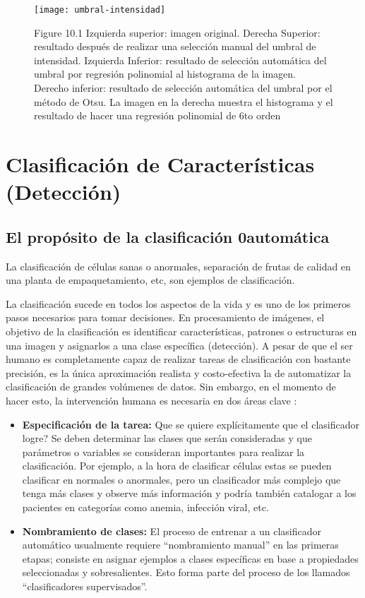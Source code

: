     \begin{figure}[H]
        \centering
        \texttt{[image: umbral-intensidad]}
        \caption{Figure 10.1 Izquierda superior: imagen original. Derecha Superior: resultado después de realizar una selección manual del umbral de intensidad. Izquierda Inferior: resultado de selección automática del umbral por regresión polinomial al histograma de la imagen. Derecho inferior: resultado de selección automática del umbral por el método de Otsu. La imagen en la derecha muestra el histograma y el resultado de hacer una regresión polinomial de 6to orden \protect\cite{Solomon2011-xz}}
        \label{fig:umbral-intensidad}
    \end{figure}
    


\section{Clasificación de Características (Detección)}
\subsection{El propósito de la clasificación 0automática}
La clasificación de células sanas o anormales, separación de frutas de calidad en una planta de empaquetamiento, etc, son ejemplos de clasificación. 

La clasificación sucede en todos los aspectos de la vida y es uno de los primeros pasos necesarios para tomar decisiones. En procesamiento de imágenes, el objetivo de la clasificación es identificar características, patrones o estructuras en una imagen y asignarlos a una clase específica (detección). A pesar de que el ser humano es completamente capaz de realizar tareas de clasificación con bastante precisión, es la única aproximación realista y costo-efectiva la de automatizar la clasificación de grandes volúmenes de datos. Sin embargo, en el momento de hacer esto, la intervención humana es necesaria en dos áreas clave \cite{Solomon2011-xz}: 

\begin{itemize}
\item \textbf{Especificación de la tarea: }Que se quiere explícitamente que el clasificador logre? Se deben determinar las clases que serán consideradas y que parámetros o variables se consideran importantes para realizar la clasificación. Por ejemplo, a la hora de clasificar células estas se pueden clasificar en normales o anormales, pero un clasificador más complejo que tenga más clases y observe más información y podría también catalogar a los pacientes en categorías como anemia, infección viral, etc.
\item \textbf{Nombramiento de clases: }El proceso de entrenar a un clasificador automático usualmente requiere “nombramiento manual” en las primeras etapas; consiste en asignar ejemplos a clases específicas en base a propiedades seleccionadas y sobresalientes. Esto forma parte del proceso de los llamados “clasificadores supervisados”.
\end{itemize}

